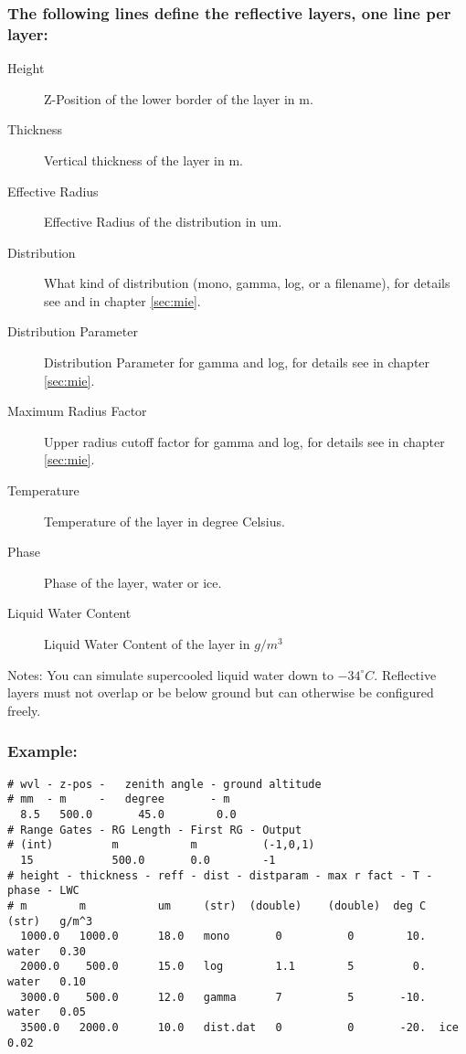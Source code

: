 \subsubsection{The following lines define the reflective layers, one line per layer:}
\begin{description}
\item[Height] Z-Position of the lower border of the layer in m.
\item[Thickness] Vertical thickness of the layer in m.
\item[Effective Radius] Effective Radius of the distribution in um.
\item[Distribution] What kind of distribution (mono, gamma, log, or a filename), for
details see  and  in chapter \ref{sec:mie}.
\item[Distribution Parameter] Distribution Parameter for gamma and log, for
details see  in chapter \ref{sec:mie}.
\item[Maximum Radius Factor] Upper radius cutoff factor for gamma and log, for
details see  in chapter \ref{sec:mie}.
\item[Temperature] Temperature of the layer in degree Celsius.
\item[Phase] Phase of the layer, water or ice.
\item[Liquid Water Content] Liquid Water Content of the layer in $g/m^3$
\end{description}
Notes: You can simulate supercooled liquid water down to $-34^{\circ}C$.
Reflective layers must not overlap or be below ground but can otherwise be 
configured freely. 

\subsubsection{Example:}
\begin{Verbatim}[fontsize=\scriptsize,frame=single]
# wvl - z-pos -   zenith angle - ground altitude
# mm  - m     -   degree       - m
  8.5   500.0       45.0        0.0
# Range Gates - RG Length - First RG - Output
# (int)         m           m          (-1,0,1)
  15            500.0       0.0        -1
# height - thickness - reff - dist - distparam - max r fact - T - phase - LWC
# m        m           um     (str)  (double)    (double)  deg C  (str)   g/m^3
  1000.0   1000.0      18.0   mono       0          0        10.  water   0.30
  2000.0    500.0      15.0   log        1.1        5         0.  water   0.10
  3000.0    500.0      12.0   gamma      7          5       -10.  water   0.05
  3500.0   2000.0      10.0   dist.dat   0          0       -20.  ice     0.02
\end{Verbatim}


